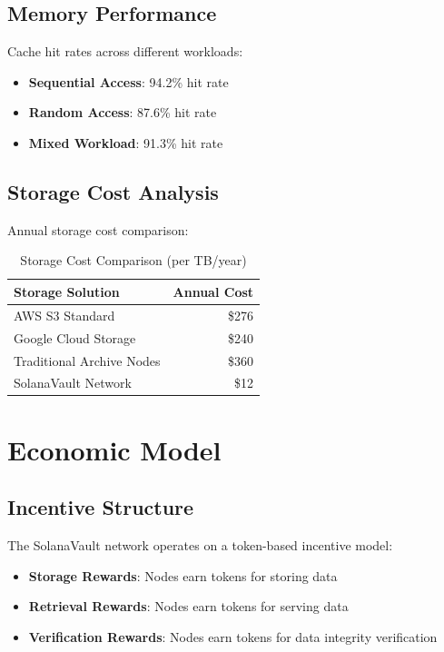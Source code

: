\documentclass[11pt,a4paper]{article}
\begin{document}
\subsection{Memory Performance}

Cache hit rates across different workloads:

\begin{itemize}
    \item \textbf{Sequential Access}: 94.2\% hit rate
    \item \textbf{Random Access}: 87.6\% hit rate
    \item \textbf{Mixed Workload}: 91.3\% hit rate
\end{itemize}

\subsection{Storage Cost Analysis}

Annual storage cost comparison:

\begin{table}[h]
\centering
\caption{Storage Cost Comparison (per TB/year)}
\begin{tabular}{@{}lr@{}}
\toprule
Storage Solution & Annual Cost \\
\midrule
AWS S3 Standard & \$276 \\
Google Cloud Storage & \$240 \\
Traditional Archive Nodes & \$360 \\
SolanaVault Network & \$12 \\
\bottomrule
\end{tabular}
\end{table}

\section{Economic Model}

\subsection{Incentive Structure}

The SolanaVault network operates on a token-based incentive model:

\begin{itemize}
    \item \textbf{Storage Rewards}: Nodes earn tokens for storing data
    \item \textbf{Retrieval Rewards}: Nodes earn tokens for serving data
    \item \textbf{Verification Rewards}: Nodes earn tokens for data integrity verification
\end{itemize}
\end{document}
